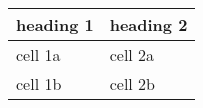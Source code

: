 \begin{longtable}[]{@{}ll@{}}
\toprule
heading 1 & heading 2\tabularnewline
\midrule
\endhead
cell 1a & cell 2a\tabularnewline
cell 1b & cell 2b\tabularnewline
\bottomrule
\end{longtable}
